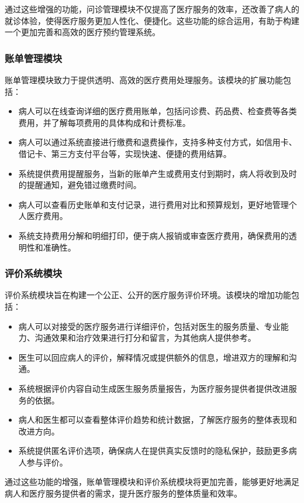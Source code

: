 通过这些增强的功能，问诊管理模块不仅提高了医疗服务的效率，还改善了病人的就诊体验，使得医疗服务更加人性化、便捷化。这些功能的综合运用，有助于构建一个更加完善和高效的医疗预约管理系统。

\subsubsection{账单管理模块}
账单管理模块致力于提供透明、高效的医疗费用处理服务。该模块的扩展功能包括：
\begin{itemize}
	\item 病人可以在线查询详细的医疗费用账单，包括问诊费、药品费、检查费等各类费用，并了解每项费用的具体构成和计费标准。
	\item 病人可以通过系统直接进行缴费和退费操作，支持多种支付方式，如信用卡、借记卡、第三方支付平台等，实现快速、便捷的费用结算。
	\item 系统提供费用提醒服务，当新的账单产生或费用支付到期时，病人将收到及时的提醒通知，避免错过缴费时间。
	\item 病人可以查看历史账单和支付记录，进行费用对比和预算规划，更好地管理个人医疗费用。
	\item 系统支持费用分解和明细打印，便于病人报销或审查医疗费用，确保费用的透明性和准确性。
\end{itemize}

\subsubsection{评价系统模块}
评价系统模块旨在构建一个公正、公开的医疗服务评价环境。该模块的增加功能包括：
\begin{itemize}
	\item 病人可以对接受的医疗服务进行详细评价，包括对医生的服务质量、专业能力、沟通效果和治疗效果进行打分和留言，为其他病人提供参考。
	\item 医生可以回应病人的评价，解释情况或提供额外的信息，增进双方的理解和沟通。
	\item 系统根据评价内容自动生成医生服务质量报告，为医疗服务提供者提供改进服务的依据。
	\item 病人和医生都可以查看整体评价趋势和统计数据，了解医疗服务的整体表现和改进方向。
	\item 系统提供匿名评价选项，确保病人在提供真实反馈时的隐私保护，鼓励更多病人参与评价。
\end{itemize}

通过这些功能的增强，账单管理模块和评价系统模块将更加完善，能够更好地满足病人和医疗服务提供者的需求，提升医疗服务的整体质量和效率。


